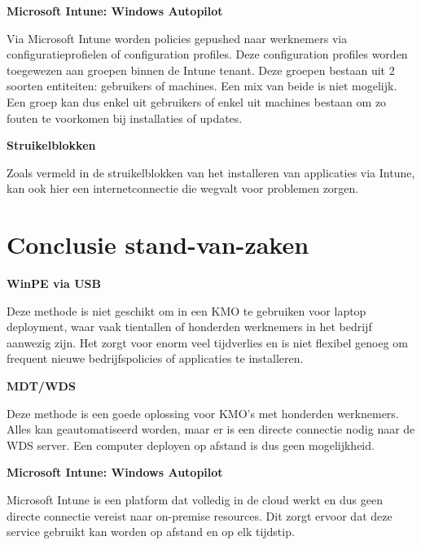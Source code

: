\textbf{Microsoft Intune: Windows Autopilot}

Via Microsoft Intune worden policies gepushed naar werknemers via configuratieprofielen of configuration profiles. Deze configuration profiles worden toegewezen aan groepen binnen de Intune tenant. Deze groepen bestaan uit 2 soorten entiteiten: gebruikers of machines. Een mix van beide is niet mogelijk. Een groep kan dus enkel uit gebruikers of enkel uit machines bestaan om zo fouten te voorkomen bij installaties of updates.



\textbf{Struikelblokken}

Zoals vermeld in de struikelblokken van het installeren van applicaties via Intune, kan ook hier een internetconnectie die wegvalt voor problemen zorgen.


\section{Conclusie stand-van-zaken}

\textbf{WinPE via USB}

Deze methode is niet geschikt om in een KMO te gebruiken voor laptop deployment, waar vaak tientallen of honderden werknemers in het bedrijf aanwezig zijn. Het zorgt voor enorm veel tijdverlies en is niet flexibel genoeg om frequent nieuwe bedrijfspolicies of applicaties te installeren.

\textbf{MDT/WDS}

Deze methode is een goede oplossing voor KMO's met honderden werknemers. Alles kan geautomatiseerd worden, maar er is een directe connectie nodig naar de WDS server. Een computer deployen op afstand is dus geen mogelijkheid.

\textbf{Microsoft Intune: Windows Autopilot}

Microsoft Intune is een platform dat volledig in de cloud werkt en dus geen directe connectie vereist naar on-premise resources. Dit zorgt ervoor dat deze service gebruikt kan worden op afstand en op elk tijdstip.




